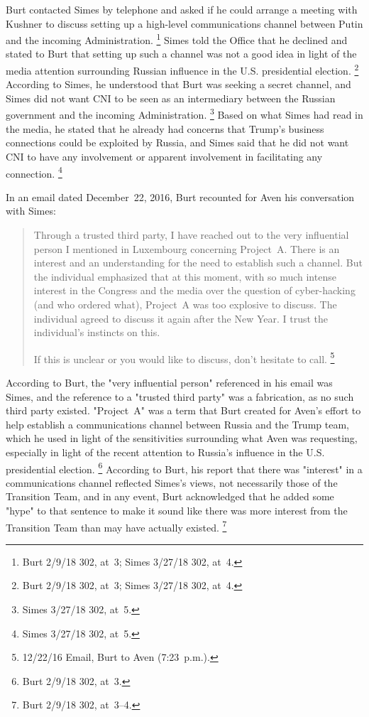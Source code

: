Burt contacted Simes by telephone and asked if he could arrange a meeting with Kushner to discuss setting up a high-level communications channel between Putin and the incoming Administration.%
\footnote{Burt 2/9/18 302, at~3;
Simes 3/27/18 302, at~4.}
Simes told the Office that he declined and stated to Burt that setting up such a channel was not a good idea in light of the media attention surrounding Russian influence in the U.S. presidential election.%
\footnote{Burt 2/9/18 302, at~3;
Simes 3/27/18 302, at~4.}
According to Simes, he understood that Burt was seeking a secret channel, and Simes did not want CNI to be seen as an intermediary between the Russian government and the incoming Administration.%
\footnote{Simes 3/27/18 302, at~5.}
Based on what Simes had read in the media, he stated that he already had concerns that Trump's business connections could be exploited by Russia, and Simes said that he did not want CNI to have any involvement or apparent involvement in facilitating any connection.%
\footnote{Simes 3/27/18 302, at~5.}

In an email dated December~22, 2016, Burt recounted for Aven his conversation with Simes:

\begin{quote}
Through a trusted third party, I have reached out to the very influential person I mentioned in Luxembourg concerning Project~A\null.
There is an interest and an understanding for the need to establish such a channel.
But the individual emphasized that at this moment, with so much intense interest in the Congress and the media over the question of cyber-hacking (and who ordered what), Project~A was too explosive to discuss.
The individual agreed to discuss it again after the New Year.
I trust the individual's instincts on this.

If this is unclear or you would like to discuss, don't hesitate to call.%
\footnote{12/22/16 Email, Burt to Aven (7:23~p.m.).}
\end{quote}

According to Burt, the "very influential person" referenced in his email was Simes, and the reference to a "trusted third party" was a fabrication, as no such third party existed.
"Project~A" was a term that Burt created for Aven's effort to help establish a communications channel between Russia and the Trump team, which he used in light of the sensitivities surrounding what Aven was requesting, especially in light of the recent attention to Russia's influence in the U.S. presidential election.%
\footnote{Burt 2/9/18 302, at~3.}
According to Burt, his report that there was "interest" in a communications channel reflected Simes's views, not necessarily those of the Transition Team, and in any event, Burt acknowledged that he added some "hype" to that sentence to make it sound like there was more interest from the Transition Team than may have actually existed.%
\footnote{Burt 2/9/18 302, at~3--4.}


